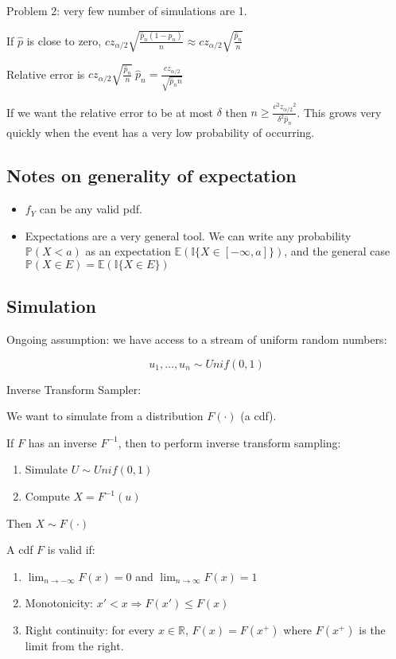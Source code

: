 Problem 2: very few number of simulations are 1.

If $\hat{p}$ is close to zero, $c z_{\alpha / 2} \sqrt{\frac{\hat{p}_n(1 - \hat{p}_n)}{n}} \approx c z_{\alpha / 2}\sqrt{\frac{\hat{p}_n}{n}}$

Relative error is $c z_{\alpha / 2}\sqrt{\frac{\hat{p}_n}{n}} \ \hat{p}_n = \frac{c z_{\alpha / 2}}{\sqrt{\hat{p}_n n}}$

If we want the relative error to be at most $\delta$ then $n \ge \frac{c^2 {z_{\alpha / 2}} ^ 2}{\delta ^ 2 \hat{p}_n}$. This grows very quickly when the event has a very low probability of occurring.

\subsection{Notes on generality of expectation}

\begin{itemize}
	\item $f_Y$ can be any valid pdf.
	\item Expectations are a very general tool. We can write any probability $\mathbb{P}(X < a)$ as an expectation $\mathbb{E}(\mathbb{I}\{ X \in [-\infty, a]\})$, and the general case $\mathbb{P}(X \in E) = \mathbb{E}(\mathbb{I}\{ X \in E \})$
\end{itemize}

\subsection{Simulation}

Ongoing assumption: we have access to a stream of uniform random numbers:

\[u_1, \dots, u_n \sim Unif(0, 1)\]

Inverse Transform Sampler:

We want to simulate from a distribution $F(\cdot)$ (a cdf).

If $F$ has an inverse $F^{-1}$, then to perform inverse transform sampling:

\begin{enumerate}
	\item Simulate $U \sim Unif(0, 1)$
	\item Compute $X = F^{-1} (u)$
\end{enumerate}

Then $X \sim F(\cdot)$

A cdf $F$ is valid if:

\begin{enumerate}
	\item $\lim_{n \rightarrow -\infty} F(x) = 0$ and $\lim_{n \rightarrow \infty} F(x) = 1$
	\item Monotonicity: $x' < x \Rightarrow F(x') \le F(x)$
	\item Right continuity: for every $x \in \mathbb{R}$, $F(x) = F(x^+)$ where $F(x^+)$ is the limit from the right.
\end{enumerate}

